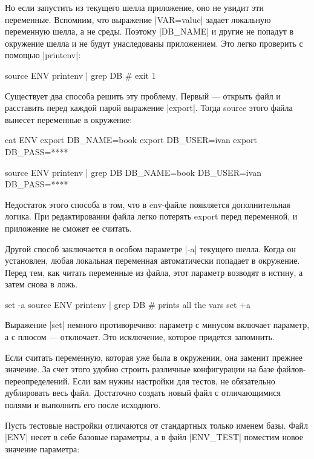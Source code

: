 Но если запустить из текущего шелла приложение, оно не увидит эти
переменные. Вспомним, что выражение \spverb|VAR=value| задает локальную переменную
шелла, а не среды. Поэтому \spverb|DB_NAME| и другие не попадут в окружение шелла и не
будут унаследованы приложением. Это легко проверить с помощью \spverb|printenv|:

\begin{code}
source ENV
printenv | grep DB
# exit 1
\end{code}

Существует два способа решить эту проблему. Первый — открыть файл и расставить
перед каждой парой выражение \spverb|export|. Тогда source этого файла вынесет
переменные в окружение:

\begin{code}
cat ENV
export DB_NAME=book
export DB_USER=ivan
export DB_PASS=****

source ENV
printenv | grep DB
DB_NAME=book
DB_USER=ivan
DB_PASS=****
\end{code}

Недостаток этого способа в том, что в env-файле появляется дополнительная
логика. При редактировании файла легко потерять export перед переменной, и
приложение не сможет ее считать.

Другой способ заключается в особом параметре \spverb|-a| текущего шелла. Когда он
установлен, любая локальная переменная автоматически попадает в окружение. Перед
тем, как читать переменные из файла, этот параметр возводят в истину, а затем
снова в ложь.

\begin{code}
set -a
source ENV
printenv | grep DB
# prints all the vars
set +a
\end{code}

Выражение \spverb|set| немного противоречиво: параметр с минусом включает параметр, а с
плюсом — отключает. Это исключение, которое придется запомнить.

Если считать переменную, которая уже была в окружении, она заменит прежнее
значение. За счет этого удобно строить различные конфигурации на базе
файлов-переопределений. Если вам нужны настройки для тестов, не обязательно
дублировать весь файл. Достаточно создать новый файл с отличающимися полями и
выполнить его после исходного.

Пусть тестовые настройки отличаются от стандартных только именем базы. Файл
\spverb|ENV| несет в себе базовые параметры, а в файл \spverb|ENV_TEST| поместим новое
значение параметра:

